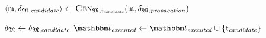 \begin{algorithmic}[1]
        \State $\tupled{\modeltuple{m},\changetuple{\metamodeltuple{M},\mathvariable{candidate}}} \gets \generalizationfunction{\metamodeltuple{M}, \provalgcandidate}(\modeltuple{m}, \changetuple{\metamodeltuple{M},\mathvariable{propagation}})$ \label{algo:orchestration:provenance:line:second_execution}
            \State \Return{$\bot$} \label{algo:orchestration:provenance:line:bot_second_execution}
        \EndIf
        \algblockskip

         \label{algo:orchestration:provenance:line:bot_failcheck}
            \State \Return{$\bot$} \label{algo:orchestration:provenance:line:bot_nonreactiveconverging}
        \EndIf
        \algblockskip
        
        \State $\changetuple{\metamodeltuple{M}} \gets \changetuple{\metamodeltuple{M},\mathvariable{candidate}}$
        \State $\provalgexecuted \gets \provalgexecuted \cup \setted{\provalgcandidate}$ \label{algo:orchestration:provenance:line:executed_update}
        \algindentskip
    \EndFor
    \algblockskip

    \State {}
    \algindentskip
\EndProcedure

\end{algorithmic}
